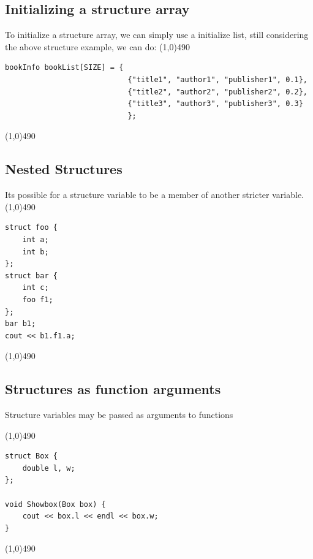 \documentclass{report}
\begin{document}
	\subsection{Initializing a structure array}
	\bigbreak \noindent 
	To initialize a structure array, we can simply use a initialize list, still considering the above structure example, we can do:
	\bigbreak \noindent 
	\line(1,0){490}
	\begin{verbatim}
bookInfo bookList[SIZE] = {
                            {"title1", "author1", "publisher1", 0.1},
                            {"title2", "author2", "publisher2", 0.2},
                            {"title3", "author3", "publisher3", 0.3}
                            };
	\end{verbatim}
	\line(1,0){490}
	\bigbreak \noindent 

	\pagebreak \bigbreak \noindent 
	\subsection{Nested Structures}
	\bigbreak \noindent 
	Its possible for a structure variable to be a member of another stricter variable.
	\bigbreak \noindent 
	\line(1,0){490}
	\begin{verbatim}
struct foo {
    int a;
    int b;
};
struct bar {
    int c;
    foo f1;
};
bar b1;
cout << b1.f1.a;
	\end{verbatim}
	\line(1,0){490}

	\bigbreak \noindent 
	\subsection{Structures as function arguments}
	\bigbreak \noindent 
	\begin{concept}
	   Structure variables may be passed as arguments to functions 
	\end{concept}
	\bigbreak \noindent 
	\line(1,0){490}
	\begin{verbatim}
struct Box {
    double l, w;
};

void Showbox(Box box) {
    cout << box.l << endl << box.w;
}
	\end{verbatim}
	\line(1,0){490}
	
	\bigbreak \noindent 
	\bigbreak \noindent 

	\pagebreak \bigbreak \noindent 
\end{document}
